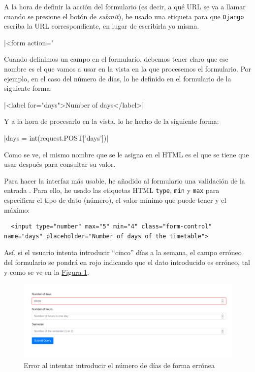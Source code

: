 \begin{enumerate}[$\bullet$]
  \item A la hora de definir la acción del formulario (es decir, a qué URL se va a llamar cuando se presione el botón de \textit{submit}), he usado una etiqueta para que \texttt{Django} escriba la URL correspondiente, en lugar de escribirla yo misma.

  |<form action="{%

  \item Cuando definimos un campo en el formulario, debemos tener claro que ese nombre es el que vamos a usar en la vista en la que procesemos el formulario. Por ejemplo, en el caso del número de días, lo he definido en el formulario de la siguiente forma:

  |<label for="days">Number of days</label>|

  Y a la hora de procesarlo en la vista, lo he hecho de la siguiente forma:

  |days = int(request.POST['days'])|

  Como se ve, el mismo nombre que se le asigna en el HTML es el que se tiene que usar después para consultar su valor.

  \item Para hacer la interfaz más usable, he añadido al formulario una validación de la entrada \cite{validatorform}. Para ello, he usado las etiquetas HTML \texttt{type}, \texttt{min} y \texttt{max} para especificar el tipo de dato (número), el valor mínimo que puede tener y el máximo:

  \begin{verbatim}
  <input type="number" max="5" min="4" class="form-control" name="days" placeholder="Number of days of the timetable">  
  \end{verbatim}

  Así, si el usuario intenta introducir ``cinco'' días a la semana, el campo erróneo del formulario se pondrá en rojo indicando que el dato introducido es erróneo, tal y como se ve en la \hyperref[validationerrornumber]{Figura \ref*{validationerrornumber}}.

  \begin{figure}
    \centering
    \includegraphics[width=\textwidth]{img/validationerrornumber}
    \caption{Error al intentar introducir el número de días de forma errónea}
    \label{validationerrornumber}
  \end{figure}

}
\end{enumerate}

